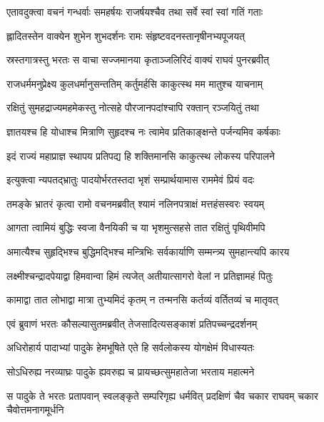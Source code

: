 \twolineshloka
{एतावदुक्त्वा वचनं गन्धर्वाः समहर्षयः}
{राजर्षयश्चैव तथा सर्वे स्वां स्वां गतिं गताः} %

\twolineshloka
{ह्लादितस्तेन वाक्येन शुभेन शुभदर्शनः}
{रामः संहृष्टवदनस्तानृषीनभ्यपूजयत्} %

\twolineshloka
{स्रस्तगात्रस्तु भरतः स वाचा सज्जमानया}
{कृताञ्जलिरिदं वाक्यं राघवं पुनरब्रवीत्} %

\twolineshloka
{राजधर्ममनुप्रेक्ष्य कुलधर्मानुसन्ततिम्}
{कर्तुमर्हसि काकुत्स्थ मम मातुश्च याचनाम्} %

\twolineshloka
{रक्षितुं सुमहद्राज्यमहमेकस्तु नोत्सहे}
{पौरजानपदांश्चापि रक्तान् रञ्जयितुं तथा} %

\twolineshloka
{ज्ञातयश्च हि योधाश्च मित्राणि सुहृदश्च नः}
{त्वामेव प्रतिकाङ्क्षन्ते पर्जन्यमिव कर्षकाः} %

\twolineshloka
{इदं राज्यं महाप्राज्ञ स्थापय प्रतिपद्य हि}
{शक्तिमानसि काकुत्स्थ लोकस्य परिपालने} %

\twolineshloka
{इत्युक्त्वा न्यपतद्भ्रातुः पादयोर्भरतस्तदा}
{भृशं सम्प्रार्थयामास राममेवं प्रियं वदः} %

\twolineshloka
{तमङ्के भ्रातरं कृत्वा रामो वचनमब्रवीत्}
{श्यामं नलिनपत्राक्षं मत्तहंसस्वरः स्वयम्} %

\twolineshloka
{आगता त्वामियं बुद्धिः स्वजा वैनयिकी च या}
{भृशमुत्सहसे तात रक्षितुं पृथिवीमपि} %

\twolineshloka
{अमात्यैश्च सुहृद्भिश्च बुद्धिमद्भिश्च मन्त्रिभिः}
{सर्वकार्याणि सम्मन्त्र्य सुमहान्त्यपि कारय} %

\twolineshloka
{लक्ष्मीश्चन्द्रादपेयाद्वा हिमवान्वा हिमं त्यजेत्}
{अतीयात्सागरो वेलां न प्रतिज्ञामहं पितुः} %

\twolineshloka
{कामाद्वा तात लोभाद्वा मात्रा तुभ्यमिदं कृतम्}
{न तन्मनसि कर्तव्यं वर्तितव्यं च मातृवत्} %

\twolineshloka
{एवं ब्रुवाणं भरतः कौसल्यासुतमब्रवीत्}
{तेजसादित्यसङ्काशं प्रतिपच्चन्द्रदर्शनम्} %

\twolineshloka
{अधिरोहार्य पादाभ्यां पादुके हेमभूषिते}
{एते हि सर्वलोकस्य योगक्षेमं विधास्यतः} %

\twolineshloka
{सोऽधिरुह्य नरव्याघ्रः पादुके ह्यवरुह्य च}
{प्रायच्छत्सुमहातेजा भरताय महात्मने} %

\fourlineindentedshloka
{स पादुके ते भरतः प्रतापवान्}
{स्वलङ्कृते सम्परिगृह्य धर्मवित्}
{प्रदक्षिणं चैव चकार राघवम्}
{चकार चैवोत्तमनागमूर्धनि} %

